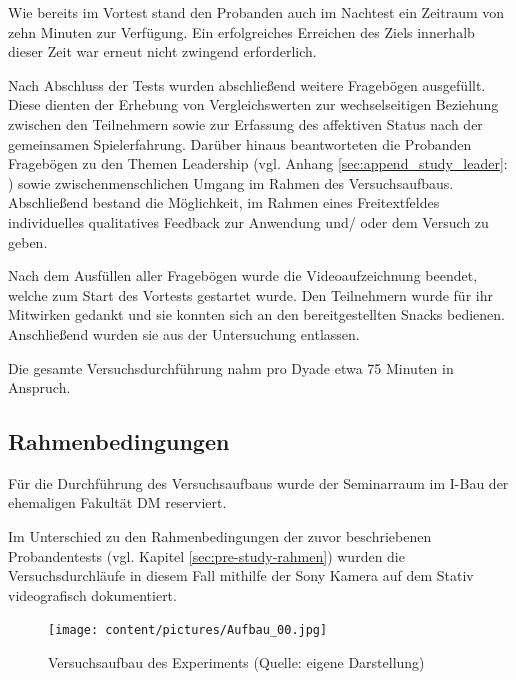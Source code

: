Wie bereits im Vortest stand den Probanden auch im Nachtest ein Zeitraum von zehn Minuten zur Verfügung. Ein erfolgreiches Erreichen des Ziels innerhalb dieser Zeit war erneut nicht zwingend erforderlich.

Nach Abschluss der Tests wurden abschließend weitere Fragebögen ausgefüllt. Diese dienten der Erhebung von Vergleichswerten zur wechselseitigen Beziehung zwischen den Teilnehmern sowie zur Erfassung des affektiven Status nach der gemeinsamen Spielerfahrung. Darüber hinaus beantworteten die Probanden Fragebögen zu den Themen Leadership (vgl. Anhang \ref{sec:append_study_leader}: ) sowie zwischenmenschlichen Umgang im Rahmen des Versuchsaufbaus. Abschließend bestand die Möglichkeit, im Rahmen eines Freitextfeldes individuelles qualitatives Feedback zur Anwendung und/ oder dem Versuch zu geben.

Nach dem Ausfüllen aller Fragebögen wurde die Videoaufzeichnung beendet, welche zum Start des Vortests gestartet wurde. Den Teilnehmern wurde für ihr Mitwirken gedankt und sie konnten sich an den bereitgestellten Snacks bedienen. Anschließend wurden sie aus der Untersuchung entlassen.

Die gesamte Versuchsdurchführung nahm pro Dyade etwa 75 Minuten in Anspruch.

\subsection{Rahmenbedingungen}


Für die Durchführung des Versuchsaufbaus wurde der Seminarraum im I-Bau der ehemaligen Fakultät \ac{DM} reserviert.

Im Unterschied zu den Rahmenbedingungen der zuvor beschriebenen Probandentests (vgl. Kapitel \ref{sec:pre-study-rahmen}) wurden die Versuchsdurchläufe in diesem Fall mithilfe der Sony Kamera auf dem Stativ videografisch dokumentiert.

\begin{figure}[ht]
\centering
\texttt{[image: content/pictures/Aufbau\_00.jpg]}
\caption{Versuchsaufbau des Experiments (Quelle: eigene Darstellung)}
\label{fig:study-experiment-00}
\end{figure}

